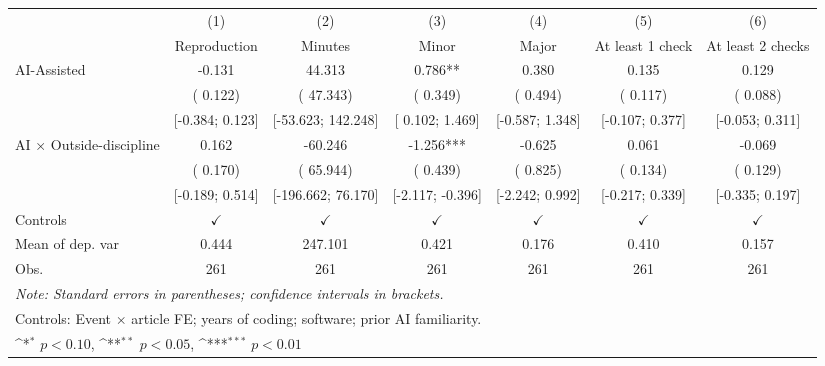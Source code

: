 \def\sym#1{\ifmmode^{#1}\else\(^{#1}\)\fi}
\begin{tabular}{l*{6}{c}}
\hline\hline
 & (1) & (2) & (3) & (4) & (5) & (6)
\\
 & Reproduction & Minutes & Minor & Major & At least 1 check & At least 2 checks
 \\
\hline
AI-Assisted & -0.131 &  44.313 &  0.786** &  0.380 &  0.135 &  0.129
\\
 & ( 0.122) & ( 47.343) & ( 0.349) & ( 0.494) & ( 0.117) & ( 0.088)
\\
 & [-0.384;  0.123] & [-53.623;  142.248] & [ 0.102;  1.469] & [-0.587;  1.348] & [-0.107;  0.377] & [-0.053;  0.311]
\\
AI × Outside-discipline &  0.162 & -60.246 & -1.256*** & -0.625 &  0.061 & -0.069
\\
 & ( 0.170) & ( 65.944) & ( 0.439) & ( 0.825) & ( 0.134) & ( 0.129)
\\
 & [-0.189;  0.514] & [-196.662;  76.170] & [-2.117; -0.396] & [-2.242;  0.992] & [-0.217;  0.339] & [-0.335;  0.197]
\\
\hline
Controls & $\checkmark$ & $\checkmark$ & $\checkmark$ & $\checkmark$ & $\checkmark$ & $\checkmark$
\\
Mean of dep. var &  0.444 &  247.101 &  0.421 &  0.176 &  0.410 &  0.157
\\
Obs. & 261 & 261 & 261 & 261 & 261 & 261
\\
\hline
\hline\hline
\multicolumn{7}{l}{\it{Note:} Standard errors in parentheses; confidence intervals in brackets.}\\
\multicolumn{7}{l}{Controls: Event $\times$ article FE; years of coding; software; prior AI familiarity.}\\
\multicolumn{7}{l}{\sym{*} $p<0.10$, \sym{**} $p<0.05$,  \sym{***} $p<0.01$}\\
\end{tabular}
